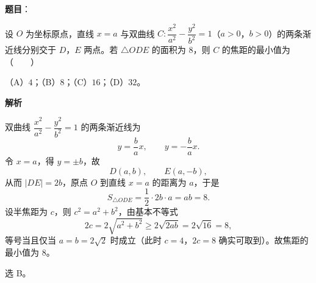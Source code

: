 \begin{answer}

\textbf{题目}：

设 $O$ 为坐标原点，直线 $x=a$ 与双曲线 $C:\dfrac{x^2}{a^2}-\dfrac{y^2}{b^2}=1$（$a>0$，$b>0$）的两条渐近线分别交于 $D$，$E$ 两点。若 $\triangle ODE$ 的面积为 $8$，则 $C$ 的焦距的最小值为\mbox{（　　）}

（A）$4$；（B）$8$；（C）$16$；（D）$32$。

\textbf{解析}

双曲线 $\dfrac{x^2}{a^2}-\dfrac{y^2}{b^2}=1$ 的两条渐近线为
\nopagebreak[4]
\[y=\frac ba x,\qquad y=-\frac ba x .\]
令 $x=a$，得 $y=\pm b$，故
\nopagebreak[4]
\[D(a,b),\qquad E(a,-b),\]
从而 $|DE|=2b$，原点 $O$ 到直线 $x=a$ 的距离为 $a$，于是
\nopagebreak[4]
\[S_{\triangle ODE}=\frac12\cdot 2b\cdot a=ab=8 .\]
设半焦距为 $c$，则 $c^2=a^2+b^2$，由基本不等式
\nopagebreak[4]
\[2c=2\sqrt{a^2+b^2}\geqslant2\sqrt{2ab}=2\sqrt{16}=8,\]
等号当且仅当 $a=b=2\sqrt2$ 时成立（此时 $c=4$，$2c=8$ 确实可取到）。故焦距的最小值为 $8$。

选 B。


\end{answer}
